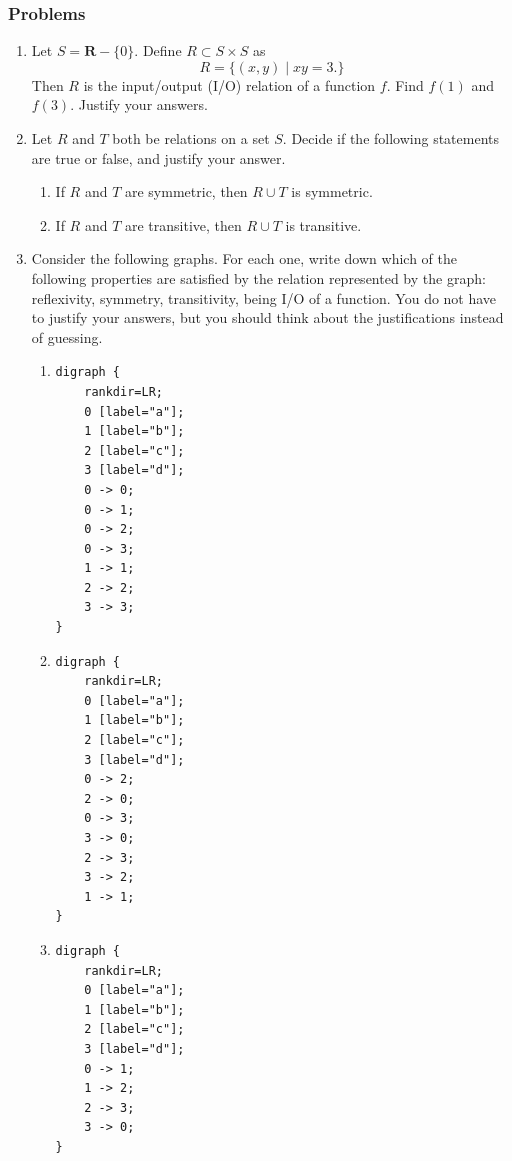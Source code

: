 \documentclass{amsart}
\begin{document}
\subsubsection{Problems}
\label{sec:org170ac4e}
\begin{enumerate}
\item Let \(S = \mathbf{R} - \{0\}\).
Define \(R \subset S \times S\) as
\[ R = \{(x,y) \mid xy = 3.\}\]
Then \(R\) is the input/output (I/O) relation of a function \(f\).
Find \(f(1)\) and \(f(3)\).  Justify your answers.

\item Let \(R\) and \(T\) both be relations on a set \(S\). 
Decide if the following statements are true or false, and justify your answer.

\begin{enumerate}
\item If \(R\) and \(T\) are symmetric, then \(R \cup T\) is symmetric.

\item If \(R\) and \(T\) are transitive, then \(R \cup T\) is transitive.
\end{enumerate}

\item Consider the following graphs. For each one, write down which of the following properties are satisfied by the relation represented by the graph: reflexivity, symmetry, transitivity, being I/O of a function. You do not have to justify your answers, but you should think about the justifications instead of guessing.
\newpage
\begin{enumerate}
\item \mbox{}
\begin{verbatim}
digraph {
    rankdir=LR;
    0 [label="a"];
    1 [label="b"];
    2 [label="c"];
    3 [label="d"];
    0 -> 0;
    0 -> 1;
    0 -> 2;
    0 -> 3;
    1 -> 1;
    2 -> 2;
    3 -> 3;
}
\end{verbatim}

\item \mbox{}
\begin{verbatim}
digraph {
    rankdir=LR;
    0 [label="a"];
    1 [label="b"];
    2 [label="c"];
    3 [label="d"];
    0 -> 2;
    2 -> 0;
    0 -> 3;
    3 -> 0;
    2 -> 3;
    3 -> 2;
    1 -> 1;
}
\end{verbatim}

\item \mbox{}
\begin{verbatim}
digraph {
    rankdir=LR;
    0 [label="a"];
    1 [label="b"];
    2 [label="c"];
    3 [label="d"];
    0 -> 1;
    1 -> 2;
    2 -> 3;
    3 -> 0;
}
\end{verbatim}
\end{enumerate}


\end{enumerate}
\end{document}
